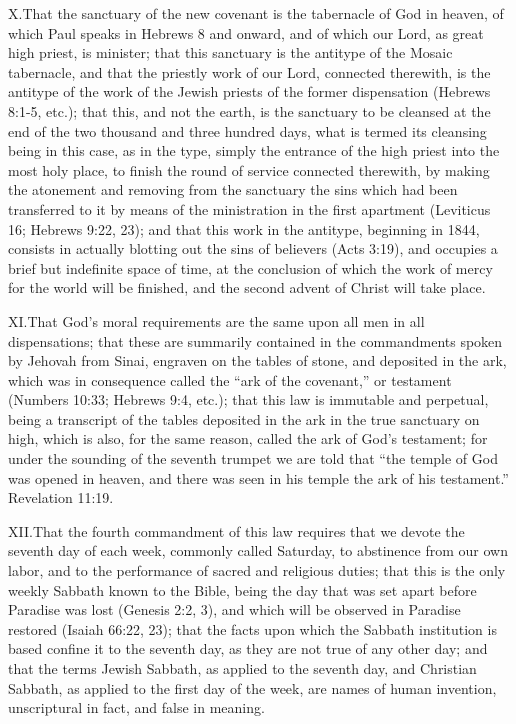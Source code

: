 \lettrine{X.} That the sanctuary of the new covenant is the tabernacle of God in heaven, of which Paul speaks in Hebrews 8 and onward, and of which our Lord, as great high priest, is minister; that this sanctuary is the antitype of the Mosaic tabernacle, and that the priestly work of our Lord, connected therewith, is the antitype of the work of the Jewish priests of the former dispensation (Hebrews 8:1-5, etc.); that this, and not the earth, is the sanctuary to be cleansed at the end of the two thousand and three hundred days, what is termed its cleansing being in this case, as in the type, simply the entrance of the high priest into the most holy place, to finish the round of service connected therewith, by making the atonement and removing from the sanctuary the sins which had been transferred to it by means of the ministration in the first apartment (Leviticus 16; Hebrews 9:22, 23); and that this work in the antitype, beginning in 1844, consists in actually blotting out the sins of believers (Acts 3:19), and occupies a brief but indefinite space of time, at the conclusion of which the work of mercy for the world will be finished, and the second advent of Christ will take place.

\lettrine{XI.} That God’s moral requirements are the same upon all men in all dispensations; that these are summarily contained in the commandments spoken by Jehovah from Sinai, engraven on the tables of stone, and deposited in the ark, which was in consequence called the “ark of the covenant,” or testament (Numbers 10:33; Hebrews 9:4, etc.); that this law is immutable and perpetual, being a transcript of the tables deposited in the ark in the true sanctuary on high, which is also, for the same reason, called the ark of God’s testament; for under the sounding of the seventh trumpet we are told that “the temple of God was opened in heaven, and there was seen in his temple the ark of his testament.” Revelation 11:19. 

\lettrine{XII.} That the fourth commandment of this law requires that we devote the seventh day of each week, commonly called Saturday, to abstinence from our own labor, and to the performance of sacred and religious duties; that this is the only weekly Sabbath known to the Bible, being the day that was set apart before Paradise was lost (Genesis 2:2, 3), and which will be observed in Paradise restored (Isaiah 66:22, 23); that the facts upon which the Sabbath institution is based confine it to the seventh day, as they are not true of any other day; and that the terms Jewish Sabbath, as applied to the seventh day, and Christian Sabbath, as applied to the first day of the week, are names of human invention, unscriptural in fact, and false in meaning.

